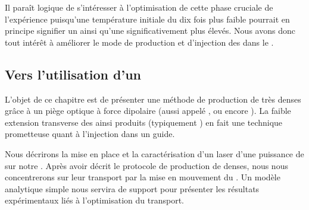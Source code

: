 Il paraît logique de s'intéresser à l'optimisation de cette phase cruciale de l'expérience puisqu'une température initiale du \jat dix fois plus faible pourrait en principe signifier un \tcolel  ainsi qu'une \ddedpup significativement plus élevés. 
Nous avons donc tout intérêt à améliorer le mode de production et d'injection des \pats dans le \gm.



\subsection{Vers l'utilisation d'un \pd}
L'objet de ce chapitre est de présenter une méthode de production de \pats très denses grâce à un piège optique à force dipolaire (aussi appelé \pd , ou encore ). La faible extension transverse des \pats ainsi produits (typiquement ) en fait une technique prometteuse quant à l'injection dans un guide.

Nous décrirons la mise en place et la caractérisation d'un laser d'une puissance de  sur notre \setup. 
Après avoir décrit le protocole de production de \pats denses, nous nous concentrerons sur leur transport par la mise en mouvement du \pd. Un modèle analytique simple nous servira de support pour présenter les résultats expérimentaux liés à l'optimisation du transport.

\casse

